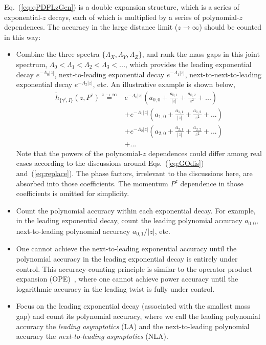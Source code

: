 \documentclass[a4paper,11pt]{article}
\begin{document}
Eq.~(\ref{eq:qPDFLzGen}) is a double expansion structure, which is a series of exponential-$z$ decays, each of which is multiplied by a series of polynomial-$z$ dependences. The accuracy in the large distance limit ($z \rightarrow \infty$) should be counted in this way: 
\begin{itemize}
\item Combine the three spectra $\{\Lambda_X,\Lambda_Y,\Lambda_Z\}$, and rank the mass gaps in this joint spectrum, $\Lambda_0<\Lambda_1<\Lambda_2<\Lambda_3<...$, which provides the leading exponential decay $e^{-\Lambda_0 |z|}$, next-to-leading exponential decay $e^{-\Lambda_1 |z|}$, next-to-next-to-leading exponential decay $e^{-\Lambda_2 |z|}$, etc. An illustrative example is shown below,
\begin{align}
\tilde{h}_{\{\gamma^t,I\}}(z,P^z) {\overset{z\rightarrow \infty}{=}}  
&e^{-\Lambda_0 |z|} \left(a_{0,0}+\frac{a_{0,1}}{|z|}+\frac{a_{0,2}}{z^2}+...\right) \nonumber\\
&+  e^{-\Lambda_1 |z|} \left(a_{1,0}+\frac{a_{1,1}}{|z|}+\frac{a_{1,2}}{z^2}+...\right) \nonumber\\
&+e^{-\Lambda_2 |z|} \left(a_{2,0} + \frac{a_{2,1}}{|z|}+\frac{a_{2,2}}{z^2}+...\right) \nonumber\\
&+ ...
\end{align}
Note that the powers of the polynomial-$z$ dependences could differ among real cases according to the discussions around Eqs.~(\ref{eq:GOdis}) and~(\ref{eq:replace}). The phase factors, irrelevant to the discussions here, are absorbed into those coefficients. The momentum $P^z$ dependence in those coefficients is omitted for simplicity. 
\item Count the polynomial accuracy within each exponential decay. For example, in the leading exponential decay, count the leading polynomial accuracy $a_{0,0}$, next-to-leading polynomial accuracy $a_{0,1}/|z|$, etc.
\item One cannot achieve the next-to-leading exponential accuracy until the polynomial accuracy in the leading exponential decay is entirely under control. This accuracy-counting principle is similar to the operator product expansion (OPE)~\cite{Ayala:2019uaw}, where one cannot achieve power accuracy until the logarithmic accuracy in the leading twist is fully under control.  
\item Focus on the leading exponential decay (associated with the smallest mass gap) and count its polynomial accuracy, where we call the leading polynomial accuracy the {\it leading asymptotics} (LA) and the next-to-leading polynomial accuracy the {\it next-to-leading asymptotics} (NLA). 
\end{itemize}
\end{document}
